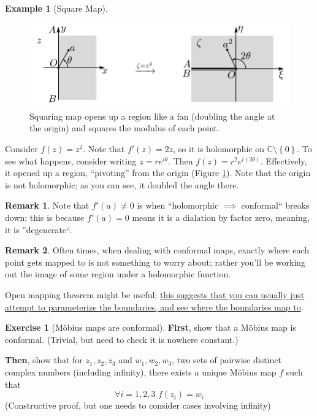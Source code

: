 \documentclass[a4paper, 12pt]{article}
\theoremstyle{definition}
\newtheorem{exercise}{Exercise}
\newtheorem{example}{Example}
\newtheorem{remark}{Remark}
\numberwithin{theorem}{section}
\numberwithin{definition}{section}
\numberwithin{exercise}{section}
\numberwithin{remark}{section}
\numberwithin{figure}{section}
\numberwithin{example}{section}
\newcommand{\C}{\mathbb{C}}
\begin{document}
\begin{example}[Square Map]
    \begin{figure}[tbp]
        \centering
        \includegraphics{square}
        \caption{Squaring map opens up a region like a fan (doubling the angle at the origin) and squares the modulus of each point.}
        \label{fig: Square Map}
    \end{figure}
    Consider $f(z) = z^2$. Note that $f'(z) = 2z$, so it is holomorphic on $\C \setminus \left\{ 0 \right\}$.
    To see what happens, consider writing $z = r e^{i \theta}$.
    Then $f(z) = r^2 e^{i \left( 2\theta \right)}$.
Effectively, it opened up a region, ``pivoting'' from the origin (Figure \ref{fig: Square Map}).
    Note that the origin is not holomorphic; as you can see, it doubled the angle there.
\end{example}
\begin{remark}
    Note that $f'(a) \neq 0$ is when ``holomorphic $\implies$ conformal`` breaks down;
    this is because $f'(a) = 0$ means it is a dialation by factor zero, meaning, it is ''degenerate``.
\end{remark}
\begin{remark}
    Often times, when dealing with conformal maps,
    exactly where each point gets mapped to is not something to worry about;
    rather you'll be working out the image of some region under a holomorphic function.

    Open mapping theorem might be useful;
    \ul{this suggests that you can usually just attempt to parameterize the boundaries, and see where the boundaries map to}.
\end{remark}
\begin{exercise}[M\"obius maps are conformal]
    \textbf{First}, show that a M\"obius map is conformal.
    (Trivial, but need to check it is nowhere constant.)

    \textbf{Then}, show that for $z_1, z_2, z_3$ and $w_1, w_2, w_3$, two sets of pairwise distinct complex numbers (including infinity),
    there exists a unique M\"obius map $f$ such that
    \begin{equation*}
        \forall i=1,2,3 \,\, f(z_i) = w_i
    \end{equation*}
    (Constructive proof, but one needs to consider cases involving infinity)
\end{exercise}
\end{document}
